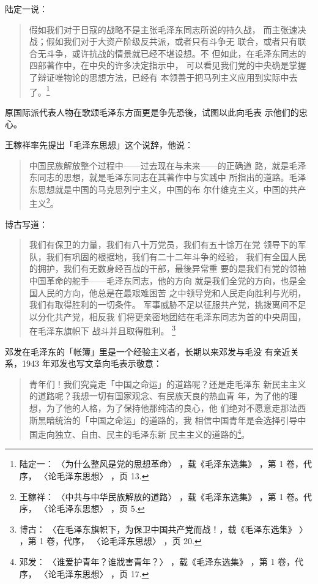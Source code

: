 陆定一说：
\begin{quote}
	\fzwkai 假如我们对于日寇的战略不是主张毛泽东同志所说的持久战，
而主张速决战；假如我们对于大资产阶级反共派，或者只有斗争无
联合，或者只有联合无斗争，或许抗战的情景就已经不堪设想。不
但如此，在毛泽东同志的四部著作中，在中央的许多决定指示中，
可以看见我们党的中央确是掌握了辩证唯物论的思想方法，已经有
本领善于把马列主义应用到实际中去了。\footnote{陆定一：
〈为什么整风是党的思想革命〉
，载《毛泽东选集》
，第 1 卷，代序，
〈论毛泽东思想〉
，页 13.} 
\end{quote}

原国际派代表人物在歌颂毛泽东方面更是争先恐後，试图以此向毛表
示他们的忠心。

王稼祥率先提出「毛泽东思想」这个说辞，他说：
\begin{quote}
	\fzwkai 中国民族解放整个过程中——过去现在与未来——的正确道
路，就是毛泽东同志的思想，就是毛泽东同志在其著作中与实践中
所指出的道路。毛泽东思想就是中国的马克思列宁主义，中国的布
尔什维克主义，中国的共产主义\footnote{王稼祥：
〈中共与中华民族解放的道路〉
，载《毛泽东选集》
，第 1 卷。代序，
〈论毛泽东思想〉
，页 5. }。
\end{quote}

博古写道：
\begin{quote}
	\fzwkai 我们有保卫的力量，我们有八十万党员，我们有五十馀万在党
领导下的军队，我们有巩固的根据地，我们有二十二年斗争的经验，
我们有全国人民的拥护，我们有无数身经百战的干部，最後异常重
要的是我们有党的领袖中国革命的舵手——毛泽东同志，他的方向
就是我们全党的方向，也是全国人民的方向，他总是在最艰难困苦
之中领导党和人民走向胜利与光明，我们有取得胜利的一切条件。
军事威胁不足以征服共产党，挑拨离间不足以分化共产党，相反我
们将更亲密地团结在毛泽东同志为首的中央周围，在毛泽东旗帜下
战斗并且取得胜利。
\footnote{博古：
〈在毛泽东旗帜下，为保卫中国共产党而战！，载《毛泽东选集》
〉
，第 1 卷，代序，
〈论毛泽东思想〉
，页
20.}
\end{quote}

邓发在毛泽东的「帐簿」里是一个经验主义者，长期以来邓发与毛没
有亲近关系，1943 年邓发也写文章向毛表示敬意：
\begin{quote}
	\fzwkai 青年们！我们究竟走「中国之命运」的道路呢？还是走毛泽东
新民主主义的道路呢？我想一切有国家观念、有民族天良的热血青
年，为了他的理想，为了他的人格，为了保持他那纯洁的良心，他
们绝对不愿意走那法西斯黑暗统治的「中国之命运」的道路的，我
相信中国青年是会选择引导中国走向独立、自由、民主的毛泽东新
民主主义的道路的\footnote{邓发：
〈谁爱护青年？谁戕害青年？〉
，载《毛泽东选集》
，第 1 卷，代序，
〈论毛泽东思想〉
，页 17.}。
\end{quote}

